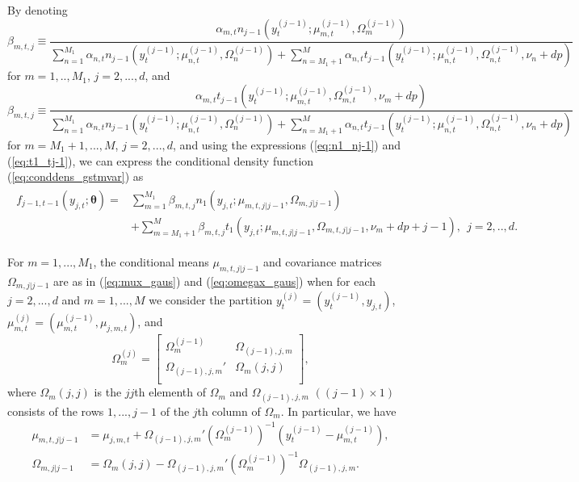\documentclass[nojss]{jss}
\begin{document}
\begin{appendix}
By denoting
\begin{equation}\label{eq:beta_mtj_t}
\beta_{m,t,j} \equiv \frac{\alpha_{m,t}n_{j-1}(y_{t}^{(j-1)};\mu_{m,t}^{(j-1)},\Omega_{m}^{(j-1)})}{\sum_{n=1}^{M_1}\alpha_{n,t} n_{j-1}(y_{t}^{(j-1)};\mu_{n,t}^{(j-1)},\Omega_{n}^{(j-1)}) +\sum_{n=M_1+1}^{M}\alpha_{n,t} t_{j-1}(y_{t}^{(j-1)};\mu_{n,t}^{(j-1)},\Omega_{n,t}^{(j-1)},\nu_n + dp)}
\end{equation}
for $m=1,..,M_1$,  $j=2,...,d$,  and
\begin{equation}\label{eq:beta_mtj_t}
\beta_{m,t,j} \equiv \frac{\alpha_{m,t}t_{j-1}(y_{t}^{(j-1)};\mu_{m,t}^{(j-1)},\Omega_{m,t}^{(j-1)},\nu_m + dp)}{\sum_{n=1}^{M_1}\alpha_{n,t} n_{j-1}(y_{t}^{(j-1)};\mu_{n,t}^{(j-1)},\Omega_{n}^{(j-1)}) +\sum_{n=M_1+1}^{M}\alpha_{n,t} t_{j-1}(y_{t}^{(j-1)};\mu_{n,t}^{(j-1)},\Omega_{n,t}^{(j-1)},\nu_n + dp)}
\end{equation}
for $m=M_1+1,...,M$,  $j=2,...,d$, and using the expressions (\ref{eq:n1_nj-1}) and (\ref{eq:t1_tj-1}),  we can express the conditional density function (\ref{eq:conddens_gstmvar}) as
\begin{align}
\begin{aligned}
f_{j-1,t-1}\left(y_{j,t};\boldsymbol{\theta}\right)=&\sum_{m=1}^{M_1}\beta_{m,t,j}n_1(y_{j,t};\mu_{m,t,j|j-1},\Omega_{m,j|j-1})\\
& + \sum_{m=M_1+1}^{M}\beta_{m,t,j}t_1(y_{j,t};\mu_{m,t,j|j-1},\Omega_{m,t,j|j-1},\nu_m + dp + j - 1), \ \ j=2,..,d.
\end{aligned}
\end{align}

For $m=1,...,M_1$, the conditional means $\mu_{m,t,j|j-1}$ and covariance matrices $\Omega_{m,j|j-1}$ are as in (\ref{eq:mux_gaus}) and (\ref{eq:omegax_gaus}) when for each $j=2,...,d$ and $m=1,...,M$ we consider the partition $y_t^{(j)}=(y_t^{(j-1)},y_{j,t})$, $\mu_{m,t}^{(j)}=(\mu_{m,t}^{(j-1)},\mu_{j,m,t})$, and
\begin{equation}
\Omega_m^{(j)}=
\begin{bmatrix}
\Omega_m^{(j-1)} \quad\enspace & \Omega_{(j-1),j,m} \\
\Omega_{(j-1),j,m}' & \Omega_{m}(j,j)  \\
\end{bmatrix},
\end{equation}
where $\Omega_{m}(j,j)$ is the $jj$th elementh of $\Omega_m$ and $\Omega_{(j-1),j,m}$ $((j-1)\times 1)$  consists of the rows $1,...,j-1$ of the $j$th column of $\Omega_m$.  In particular, we have
\begin{align}
\mu_{m,t,j|j-1} &=\mu_{j,m,t} + \Omega_{(j-1),j,m}'(\Omega_m^{(j-1)})^{-1}(y_t^{(j-1)}-\mu_{m,t}^{(j-1)}),\label{eq:cond_mu_mtj_n}\\
\Omega_{m,j|j-1} &= \Omega_{m}(j,j) - \Omega_{(j-1),j,m}'(\Omega_m^{(j-1)})^{-1} \Omega_{(j-1),j,m}. \label{eq:cond_omega_mj_n}
\end{align}


\end{appendix}
\end{document}
